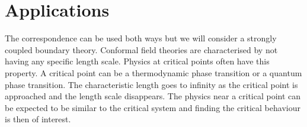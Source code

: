 \documentclass[12pt]{report}
\newcommand{\e}{\ensuremath{\mathrm{e}}}
\renewcommand{\L}{\ensuremath{\mathcal{L}}}
\renewcommand{\i}{\ensuremath{i}}
\begin{document}
% 
\section{Applications}
The correspondence can be used both ways but we will consider a strongly coupled boundary theory. Conformal field theories are characterised by not having any specific length scale. Physics at critical points often have this property. A critical point can be a thermodynamic phase transition or a quantum phase transition. The characteristic length goes to infinity as the critical point is approached and the length scale disappears. The physics near a critical point can be expected to be similar to the critical system and finding the critical behaviour is then of interest.\\
\end{document}
